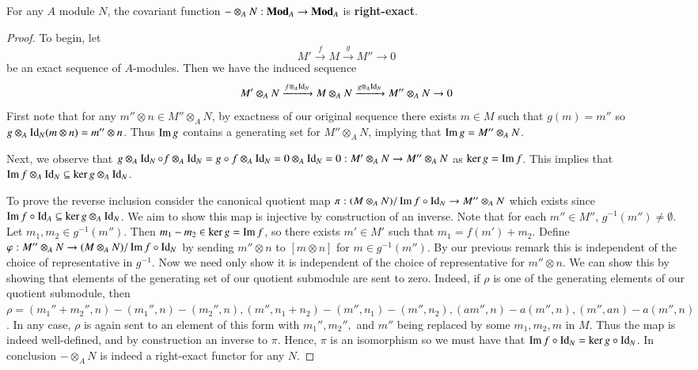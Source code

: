 \begin{theorem}
    For any $A$ module $N$, the covariant function $-\otimes_AN:\normalfont\textbf{Mod}_A\rightarrow \normalfont\textbf{Mod}_A$ is \textbf{right-exact}.
\end{theorem}
\begin{proof}
    To begin, let $$M'\xrightarrow{f} M\xrightarrow{g} M''\rightarrow 0$$ be an exact sequence of $A$-modules. Then we have the induced sequence $$M'\otimes_AN\xrightarrow{f\otimes_A\operatorname{Id}_N}M\otimes_AN\xrightarrow{g\otimes_A\operatorname{Id}_N}M''\otimes_AN\rightarrow 0$$
    First note that for any $m''\otimes n \in M''\otimes_AN$, by exactness of our original sequence there exists $m \in M$ such that $g(m) = m''$ so $g\otimes_A \operatorname{Id}_N(m\otimes n) = m''\otimes n$. Thus $\operatorname{Im} g$ contains a generating set for $M''\otimes_AN$, implying that $\operatorname{Im} g = M''\otimes_AN$.

    Next, we observe that $g\otimes_A\operatorname{Id}_N\circ f\otimes_A\operatorname{Id}_N = g\circ f\otimes_A\operatorname{Id}_N = 0\otimes_A\operatorname{Id}_N = 0:M'\otimes_AN\rightarrow M''\otimes_AN$ as $\ker g = \operatorname{Im} f$. This implies that $\operatorname{Im} f\otimes_A\operatorname{Id}_N \subseteq \ker g\otimes_A\operatorname{Id}_N$. 

    To prove the reverse inclusion consider the canonical quotient map $\pi:(M\otimes_AN)/\operatorname{Im} f\circ\operatorname{Id}_N\rightarrow M''\otimes_AN$ which exists since $\operatorname{Im} f\circ \operatorname{Id}_A \subseteq \ker g\otimes_A\operatorname{Id}_N$. We aim to show this map is injective by construction of an inverse. Note that for each $m'' \in M''$, $g^{-1}(m'') \neq \emptyset$. Let $m_1,m_2 \in g^{-1}(m'')$. Then $m_1-m_2 \in \ker g = \operatorname{Im} f$, so there exists $m' \in M'$ such that $m_1 = f(m') + m_2$. Define $\varphi:M''\otimes_AN\rightarrow (M\otimes_A N)/\operatorname{Im} f\circ \operatorname{Id}_N$ by sending $m''\otimes n$ to $[m\otimes n]$ for $m \in g^{-1}(m'')$. By our previous remark this is independent of the choice of representative in $g^{-1}$. Now we need only show it is independent of the choice of representative for $m''\otimes n$. We can show this by showing that elements of the generating set of our quotient submodule are sent to zero. Indeed, if $\rho$ is one of the generating elements of our quotient submodule, then $\rho = (m_1''+m_2'',n) - (m_1'',n)-(m_2'',n), (m'',n_1+n_2)-(m'',n_1)-(m'',n_2),(am'',n)-a(m'',n),(m'',an)-a(m'',n)$. In any case, $\rho$ is again sent to an element of this form with $m_1'',m_2'',$ and $m''$ being replaced by some $m_1,m_2,m$ in $M$. Thus the map is indeed well-defined, and by construction an inverse to $\pi$. Hence, $\pi$ is an isomorphism so we must have that $\operatorname{Im} f\circ \operatorname{Id}_N = \ker g\circ \operatorname{Id}_N$. In conclusion $-\otimes_AN$ is indeed a right-exact functor for any $N$.
\end{proof}

